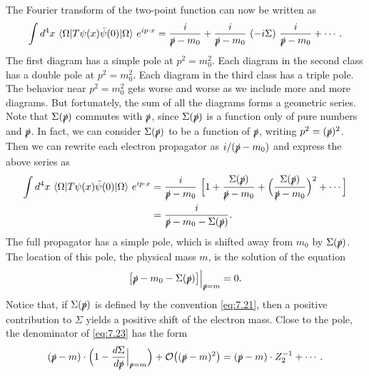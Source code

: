 The Fourier transform of the two-point function can now be written as
\begin{equation}
  \int d^4x\ \langle\Omega|T\psi(x)\bar{\psi}(0)|\Omega\rangle\ e^{ip\cdot x}
  = \frac{i}{\slashed{p}-m_0}
    + \frac{i}{\slashed{p}-m_0}\ (-i\Sigma)\ \frac{i}{\slashed{p}-m_0}
    + \cdots .
  \label{eq:7.22}
\end{equation}
The first diagram has a simple pole at $p^2 = m_0^2$.  Each diagram in the
second class has a double pole at $p^2 = m_0^2$.  Each diagram in the third
class has a triple pole.  The behavior near $p^2 = m_0^2$ gets worse and worse
as we include more and more diagrams.  But fortunately, the sum of all the
diagrams forms a geometric series.  Note that $\Sigma(\slashed{p})$
commutes with $\slashed{p}$, since $\Sigma(\slashed{p})$ is a function only of
pure numbers and $\slashed{p}$.  In fact, we can consider
$\Sigma(\slashed{p})$ to be a function of $\slashed{p}$, writing
$p^2 = (\slashed{p})^2$.  Then we can rewrite each electron propagator as
$i/(\slashed{p}-m_0)$ and express the above series as
\begin{equation}
  \begin{aligned}
    \int d^4x\ \langle\Omega|T\psi(x)\bar{\psi}(0)|\Omega\rangle\ e^{ip\cdot x}
    &= \frac{i}{\slashed{p}-m_0}\ \Bigl[ 1 +
      \frac{\Sigma(\slashed{p})}{\slashed{p}-m_0}
      + \Bigl( \frac{\Sigma(\slashed{p})}{\slashed{p}-m_0} \Bigr)^2
      + \cdots \Bigr]\\
    &= \frac{i}{\slashed{p}-m_0-\Sigma(\slashed{p})} .
  \end{aligned}
  \label{eq:7.23}
\end{equation}
The full propagator has a simple pole, which is shifted away from $m_0$ by
$\Sigma(\slashed{p})$.  The location of this pole, the physical mass $m$, is
the solution of the equation
\begin{equation}
  \bigl[ \slashed{p} - m_0 - \Sigma(\slashed{p}) \bigr]
    \Big|_{\slashed{p}=m} = 0 .
  \label{eq:7.24}
\end{equation}
Notice that, if $\Sigma(\slashed{p})$ is defined by the convention
\eqref{eq:7.21}, then a positive contribution to $\Sigma$ yields a positive
shift of the electron mass.  Close to the pole, the denominator of
\eqref{eq:7.23} has the form
\begin{equation}
  (\slashed{p}-m)\cdot \Bigl( 1 - \frac{d\Sigma}{d\slashed{p}}
    \Big|_{\slashed{p}=m} \Bigr) + \mathcal{O}\bigl( (\slashed{p}-m)^2 \bigr)
  = (\slashed{p}-m)\cdot Z_2^{-1} + \cdots .
  \label{eq:7.25}
\end{equation}

